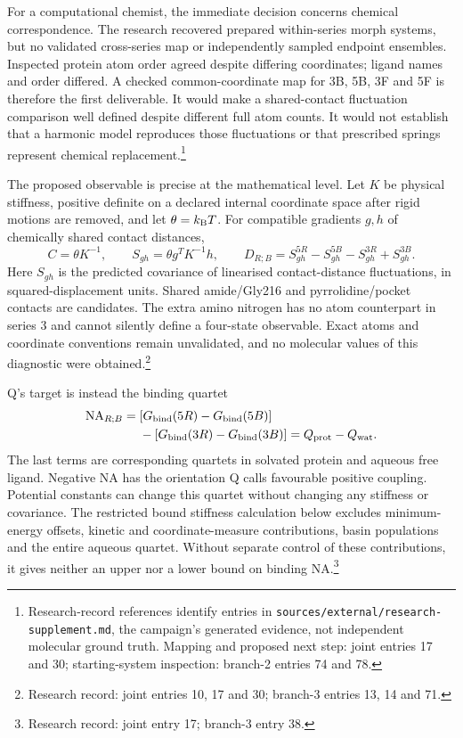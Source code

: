 \documentclass{article}
\begin{document}
For a computational chemist, the immediate decision concerns chemical correspondence. The research recovered prepared within-series morph systems, but no validated cross-series map or independently sampled endpoint ensembles. Inspected protein atom order agreed despite differing coordinates; ligand names and order differed. A checked common-coordinate map for 3B, 5B, 3F and 5F is therefore the first deliverable. It would make a shared-contact fluctuation comparison well defined despite different full atom counts. It would not establish that a harmonic model reproduces those fluctuations or that prescribed springs represent chemical replacement.\footnote{Research-record references identify entries in \texttt{sources/external/research-supplement.md}, the campaign's generated evidence, not independent molecular ground truth. Mapping and proposed next step: joint entries 17 and 30; starting-system inspection: branch-2 entries 74 and 78.}

The proposed observable is precise at the mathematical level. Let \(K\) be physical stiffness, positive definite on a declared internal coordinate space after rigid motions are removed, and let \(\theta=k_{\rm B}T\). For compatible gradients \(g,h\) of chemically shared contact distances,
\[
 C=\theta K^{-1},\qquad S_{gh}=\theta g^TK^{-1}h,
 \qquad D_{R;B}=S_{gh}^{5R}-S_{gh}^{5B}-S_{gh}^{3R}+S_{gh}^{3B}.
\]
Here \(S_{gh}\) is the predicted covariance of linearised contact-distance fluctuations, in squared-displacement units. Shared amide/Gly216 and pyrrolidine/pocket contacts are candidates. The extra amino nitrogen has no atom counterpart in series 3 and cannot silently define a four-state observable. Exact atoms and coordinate conventions remain unvalidated, and no molecular values of this diagnostic were obtained.\footnote{Research record: joint entries 10, 17 and 30; branch-3 entries 13, 14 and 71.}

Q's target is instead the binding quartet~\cite{Q}
\[
\begin{split}
 \mathrm{NA}_{R;B}={}&[G_{\rm bind}(5R)-G_{\rm bind}(5B)]\\
 &-[G_{\rm bind}(3R)-G_{\rm bind}(3B)]
 =Q_{\rm prot}-Q_{\rm wat}.
\end{split}
\]
The last terms are corresponding quartets in solvated protein and aqueous free ligand. Negative NA has the orientation Q calls favourable positive coupling. Potential constants can change this quartet without changing any stiffness or covariance. The restricted bound stiffness calculation below excludes minimum-energy offsets, kinetic and coordinate-measure contributions, basin populations and the entire aqueous quartet. Without separate control of these contributions, it gives neither an upper nor a lower bound on binding NA.\footnote{Research record: joint entry 17; branch-3 entry 38.}
\end{document}
